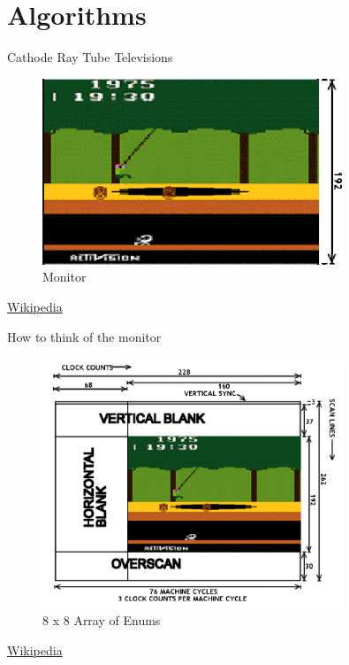 \documentclass{beamer}
\begin{document}
\section{Algorithms}





\begin{frame}{Cathode Ray Tube Televisions}
    \begin{figure}
        \centering
        \includegraphics[width=0.8\textwidth]{monitor.png} %

        \caption{Monitor}
    \end{figure}
\href{https://en.wikipedia.org/wiki/Alpha\%E2\%80\%93beta_pruning}{Wikipedia}
\end{frame}


\begin{frame}{How to think of the monitor}
    \begin{figure}
        \centering
        \includegraphics[width=0.8\textwidth]{screen_whole.png} %

        \caption{8 x 8 Array of Enums}
    \end{figure}
\href{https://en.wikipedia.org/wiki/Alpha\%E2\%80\%93beta_pruning}{Wikipedia}
\end{frame}
\end{document}
